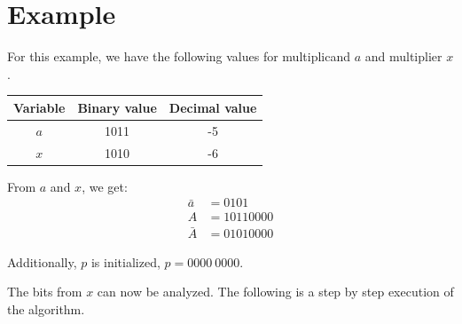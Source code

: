 \documentclass[titlepage]{article}
\begin{document}



\section{Example} %
\label{sec:example}

For this example, we have the following values for multiplicand $a$ and multiplier $x$.

\begin{table}[ht]
    \centering
    \begin{tabular}{ccc}
        \toprule
        Variable & Binary value & Decimal value \\
        \midrule
        $a$ & 1011 & -5 \\
        $x$ & 1010 & -6 \\
        \bottomrule
    \end{tabular}
\end{table}

From $a$ and $x$, we get:
\begin{align*}
    \bar{a} &= 0101 \\
    A &= 1011 0000 \\
    \bar{A} &= 0101 0000
\end{align*}\par

Additionally, $p$ is initialized, $p = 0000~0000$.\par

The bits from $x$ can now be analyzed.
The following is a step by step execution of the algorithm.\par
\end{document}
